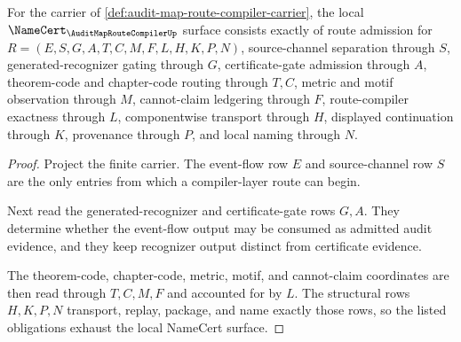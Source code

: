 \begin{theorem}
\label{thm:audit-map-route-compiler-namecert-obligations}
For the carrier of \autoref{def:audit-map-route-compiler-carrier}, the local $\NameCert_{\AuditMapRouteCompilerUp}$ surface consists exactly of route admission for $R=(E,S,G,A,T,C,M,F,L,H,K,P,N)$, source-channel separation through $S$, generated-recognizer gating through $G$, certificate-gate admission through $A$, theorem-code and chapter-code routing through $T,C$, metric and motif observation through $M$, cannot-claim ledgering through $F$, route-compiler exactness through $L$, componentwise transport through $H$, displayed continuation through $K$, provenance through $P$, and local naming through $N$.
\end{theorem}
\begin{proof}
Project the finite carrier. The event-flow row $E$ and source-channel row $S$ are the only entries from which a compiler-layer route can begin.

Next read the generated-recognizer and certificate-gate rows $G,A$. They determine whether the event-flow output may be consumed as admitted audit evidence, and they keep recognizer output distinct from certificate evidence.

The theorem-code, chapter-code, metric, motif, and cannot-claim coordinates are then read through $T,C,M,F$ and accounted for by $L$. The structural rows $H,K,P,N$ transport, replay, package, and name exactly those rows, so the listed obligations exhaust the local NameCert surface.
\end{proof}

